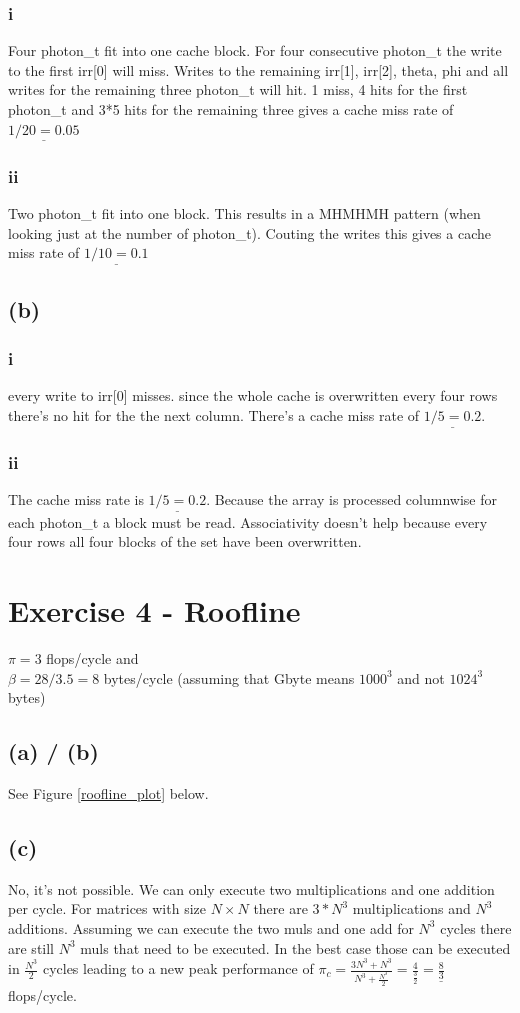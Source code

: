 \documentclass[10pt,a4paper,oneside,notitlepage]{report}
\begin{document}
\subsubsection*{i}
Four photon\_t fit into one cache block. For four consecutive photon\_t the write to the first irr[0] will miss. Writes to the remaining irr[1], irr[2], theta, phi and all writes for the remaining three photon\_t will hit. 1 miss, 4 hits for the first photon\_t and 3*5 hits for the remaining three gives a cache miss rate of $\underline{1/20=0.05}$
\subsubsection*{ii}
Two photon\_t fit into one block. This results in a MHMHMH pattern (when looking just at the number of photon\_t). Couting the writes this gives a cache miss rate of $\underline{1/10=0.1}$
\subsection*{(b)}
\subsubsection*{i}
every write to irr[0] misses. since the whole cache is overwritten every four rows there's no hit for the the next column. There's a cache miss rate of $\underline{1/5=0.2}$.
\subsubsection*{ii}
The cache miss rate is $\underline{1/5=0.2}$. Because the array is processed columnwise for each photon\_t a block must be read. Associativity doesn't help because every four rows all four blocks of the set have been overwritten.

\section*{Exercise 4 - Roofline}
$\pi = 3$ flops/cycle and \\
$\beta = 28/3.5 =8$ bytes/cycle (assuming that Gbyte means $1000^3$ and not $1024^3$ bytes)
\subsection*{(a) / (b)}

See Figure \ref{roofline_plot} below.

\subsection*{(c)}
No, it's not possible. We can only execute two multiplications and one addition per cycle. For matrices with size $N \times N$ there are $3*N^3$ multiplications and $N^3$ additions. Assuming we can execute the two muls and one add for $N^3$ cycles there are still $N^3$ muls that need to be executed. In the best case those can be executed in $\frac{N^3}{2}$ cycles leading to a new peak performance of $\pi_c= \frac{3N^3 + N^3}{N^3 + \frac{N^3}{2}}=\frac{4}{\frac{3}{2}}=\underline{\frac{8}{3}}$ flops/cycle.
\end{document}
